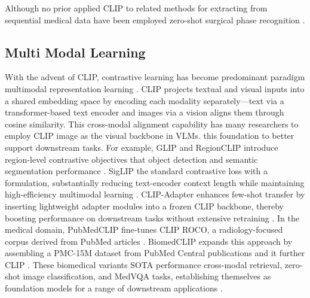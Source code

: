 \documentclass[bioengineering,article,submit,pdftex,moreauthors]{Definitions/mdpi}
\begin{document}
Although no prior   applied CLIP to  related methods for extracting  from sequential medical data have been employed  zero-shot surgical phase recognition \cite{yuan_hecvl_2025}.


\subsection{Multi Modal Learning}
With the advent of CLIP, contrastive learning has become  predominant paradigm  multimodal representation learning \cite{radford_learning_2021}. 
CLIP projects textual and visual inputs into a shared embedding space by encoding each modality separately—text via a transformer-based text encoder and images via a vision  aligns them through cosine similarity. 
This cross-modal alignment capability has  many researchers to employ CLIP image  as the visual backbone in VLMs. 
   this foundation to better support downstream tasks. For example, GLIP and RegionCLIP introduce region-level contrastive objectives that  object detection and semantic segmentation performance \cite{li_grounded_2022,zhong_regionclip_2022}.
SigLIP  the standard contrastive loss with a  formulation, substantially reducing text-encoder context length while maintaining high-efficiency multimodal learning \cite{zhai_sigmoid_2023}. 
CLIP-Adapter enhances few-shot transfer by inserting lightweight adapter modules into a frozen CLIP backbone, thereby boosting performance on downstream tasks without extensive retraining \cite{gao_clip-adapter_2024}. 
In the medical domain, PubMedCLIP fine-tunes CLIP  ROCO, a radiology-focused corpus derived from PubMed articles \cite{eslami_pubmedclip_2023,pelka_radiology_2018}. 
BiomedCLIP expands this approach by assembling a PMC-15M dataset from PubMed Central publications and  it  further CLIP \cite{zhang_biomedclip_2025}. 
These biomedical variants  SOTA performance  cross-modal retrieval, zero-shot image classification, and MedVQA tasks, establishing themselves as foundation models for a  range of downstream  applications \cite{koleilat_medclip-sam_2024,zhao_foundation_2024,polis_exploring_2025}.
\end{document}

